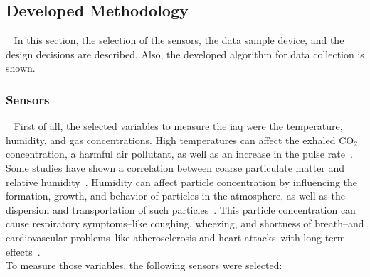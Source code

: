 \subsection{Developed Methodology}
~\label{sec:methodology:dev_methodology}
\hspace{8pt}
In this section, the selection of the sensors, the data sample device, and the design decisions are described. Also, the developed algorithm for data collection is shown.


\subsubsection{Sensors}
~\label{sec:methodology:dev_methodology:sensors}
\hspace{8pt}
First of all, the selected variables to measure the \acrshort{iaq} were the temperature, humidity, and gas concentrations. High temperatures can affect the exhaled CO$_{2}$ concentration, a harmful air pollutant, as well as an increase in the pulse rate~\cite{en14238127}. Some studies have shown a correlation between coarse particulate matter and relative humidity~\cite{yang_2020, tanatachalert_2023, xing_2016}. Humidity can affect particle concentration by influencing the formation, growth, and behavior of particles in the atmosphere, as well as the dispersion and transportation of such particles~\cite{tanatachalert_2023}. This particle concentration can cause respiratory symptoms--like coughing, wheezing, and shortness of breath--and cardiovascular problems--like atherosclerosis and heart attacks--with long-term effects~\cite{ahamed_2022, ding_2021, tang_2021}. \\

To measure those variables, the following sensors were selected:

